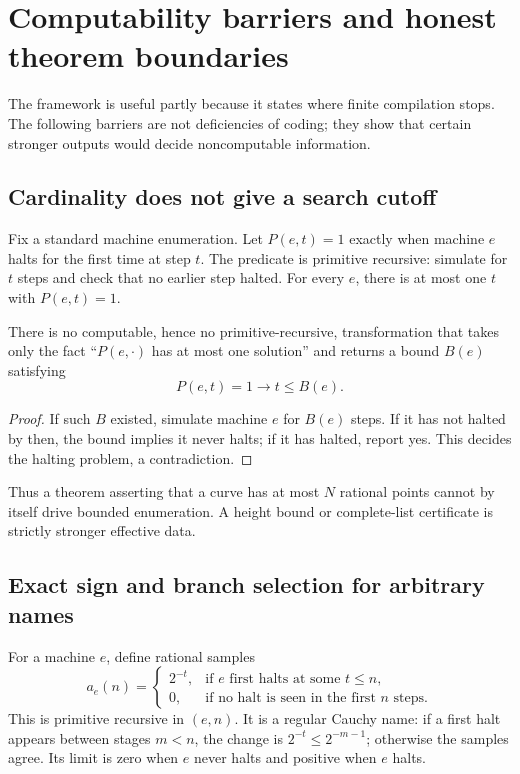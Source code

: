 \section{Computability barriers and honest theorem boundaries}\label{sec:barriers}

The framework is useful partly because it states where finite compilation stops.  The following barriers are not deficiencies of coding; they show that certain stronger outputs would decide noncomputable information.

\subsection{Cardinality does not give a search cutoff}

Fix a standard machine enumeration.  Let \(P(e,t)=1\) exactly when machine \(e\) halts for the first time at step \(t\).  The predicate is primitive recursive: simulate for \(t\) steps and check that no earlier step halted.  For every \(e\), there is at most one \(t\) with \(P(e,t)=1\).

\begin{barrier}\label{bar:cardinality}
There is no computable, hence no primitive-recursive, transformation that takes only the fact ``\(P(e,\cdot)\) has at most one solution'' and returns a bound \(B(e)\) satisfying
\[
  P(e,t)=1\longrightarrow t\leq B(e).
\]
\end{barrier}

\begin{proof}
If such \(B\) existed, simulate machine \(e\) for \(B(e)\) steps.  If it has not halted by then, the bound implies it never halts; if it has halted, report yes.  This decides the halting problem, a contradiction.
\end{proof}

Thus a theorem asserting that a curve has at most \(N\) rational points cannot by itself drive bounded enumeration.  A height bound or complete-list certificate is strictly stronger effective data.

\subsection{Exact sign and branch selection for arbitrary names}

For a machine \(e\), define rational samples
\[
 a_e(n)=
 \begin{cases}
  2^{-t},&\text{if }e\text{ first halts at some }t\leq n,\\
  0,&\text{if no halt is seen in the first }n\text{ steps}.
 \end{cases}
\]
This is primitive recursive in \((e,n)\).  It is a regular Cauchy name: if a first halt appears between stages \(m<n\), the change is \(2^{-t}\leq2^{-m-1}\); otherwise the samples agree.  Its limit is zero when \(e\) never halts and positive when \(e\) halts.

